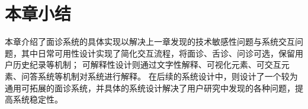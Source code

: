 \section{本章小结}
本章介绍了面诊系统的具体实现以解决上一章发现的技术敏感性问题与系统交互问题，其中日常可用性设计实现了简化交互流程，将面诊、舌诊、问诊可选，保留用户历史纪录等机制；
可解释性设计则通过文字性解释、可视化元素、可交互元素、问答系统等机制对系统进行解释。
在后续的系统设计中，则设计了一个较为通用可拓展的面诊系统，并具体的系统设计解决了用户研究中发现的各种问题，提高系统稳定性。